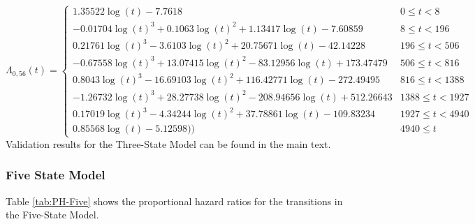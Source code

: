 \documentclass[
]{article}
\begin{document}
\begin{equation}
\Lambda_{0,56}(t)=\begin{cases} 1.35522\log(t)-7.7618 & 0 \le t < 8 \\ -0.01704\log(t)^3+0.1063\log(t)^2+1.13417\log(t)-7.60859 & 8 \le t < 196 \\ 0.21761\log(t)^3-3.6103\log(t)^2+20.75671\log(t)-42.14228 & 196 \le t < 506 \\ -0.67558\log(t)^3+13.07415\log(t)^2-83.12956\log(t)+173.47479 & 506 \le t < 816 \\ 0.8043\log(t)^3-16.69103\log(t)^2+116.42771\log(t)-272.49495 & 816 \le t < 1388 \\ -1.26732\log(t)^3+28.27738\log(t)^2-208.94656\log(t)+512.26643 & 1388 \le t < 1927 \\ 0.17019\log(t)^3-4.34244\log(t)^2+37.78861\log(t)-109.83234 & 1927 \le t < 4940 \\ 0.85568\log(t)-5.12598)) & 4940 \le t \label{eq:CH-Three-56}\end{cases}
\end{equation}
Validation results for the Three-State Model can be found in the main text.

\hypertarget{five-state-model}{%
\subsubsection{Five State Model}\label{five-state-model}}

Table \ref{tab:PH-Five} shows the proportional hazard ratios for the transitions in the Five-State Model.
\end{document}
